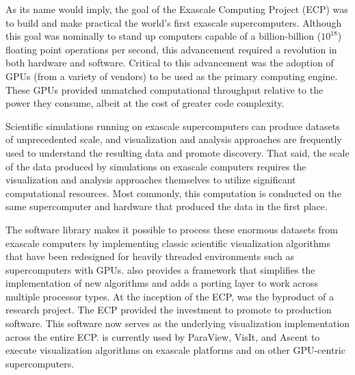 As its name would imply, the goal of the Exascale Computing Project (ECP) was to build and make practical the world's first exascale supercomputers.
Although this goal was nominally to stand up computers capable of a billion-billion ($10^{18}$) floating point operations per second, this advancement required a revolution in both hardware and software.
Critical to this advancement was the adoption of GPUs (from a variety of vendors) to be used as the primary computing engine.
These GPUs provided unmatched computational throughput relative to the power they consume, albeit at the cost of greater code complexity.%

Scientific simulations running on exascale supercomputers can produce datasets of unprecedented
scale, and
visualization and analysis approaches are frequently used to understand the resulting
data and promote discovery.
%
That said, the scale of the data produced by simulations on exascale computers requires
the visualization and analysis approaches themselves to utilize significant computational resources.
%
Most commonly, this computation is conducted on the same supercomputer and hardware that produced
the data in the first place.

The \vtkm software library makes it possible to process these enormous datasets from exascale computers
by implementing classic scientific visualization algorithms that have been redesigned for heavily threaded environments such as supercomputers with GPUs.
\vtkm also provides a framework that simplifies the implementation of new algorithms and adds a porting layer to work across multiple processor types.
At the inception of the ECP, \vtkm was the byproduct of a research project.
The ECP provided the investment to promote \vtkm to production software.
This software now serves as the underlying visualization implementation across the entire ECP.
\vtkm is currently used by ParaView, VisIt, and Ascent to execute visualization algorithms on exascale platforms and on other GPU-centric supercomputers.


